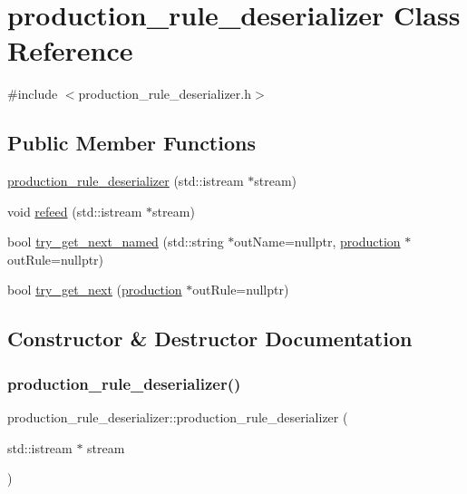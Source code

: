\hypertarget{classproduction__rule__deserializer}{}\section{production\+\_\+rule\+\_\+deserializer Class Reference}
\label{classproduction__rule__deserializer}


{\ttfamily \#include $<$production\+\_\+rule\+\_\+deserializer.\+h$>$}

\subsection*{Public Member Functions}
\begin{DoxyCompactItemize}
\item 
\mbox{\hyperlink{classproduction__rule__deserializer_a7a3ef59bfb52ee7d24087a29f0c31614}{production\+\_\+rule\+\_\+deserializer}} (std\+::istream $\ast$stream)
\item 
void \mbox{\hyperlink{classproduction__rule__deserializer_a12eb54478b2e86fed70db8c7a1131111}{refeed}} (std\+::istream $\ast$stream)
\item 
bool \mbox{\hyperlink{classproduction__rule__deserializer_a0394f0fc142fa283f84a951c94bca242}{try\+\_\+get\+\_\+next\+\_\+named}} (std\+::string $\ast$out\+Name=nullptr, \mbox{\hyperlink{classproduction}{production}} $\ast$out\+Rule=nullptr)
\item 
bool \mbox{\hyperlink{classproduction__rule__deserializer_a12fef5492a82d2716670f09b558d4ce3}{try\+\_\+get\+\_\+next}} (\mbox{\hyperlink{classproduction}{production}} $\ast$out\+Rule=nullptr)
\end{DoxyCompactItemize}


\subsection{Constructor \& Destructor Documentation}
\mbox{\label{classproduction__rule__deserializer_a7a3ef59bfb52ee7d24087a29f0c31614}} 
\subsubsection{\texorpdfstring{production\_rule\_deserializer()}{production\_rule\_deserializer()}}
{\footnotesize\ttfamily production\+\_\+rule\+\_\+deserializer\+::production\+\_\+rule\+\_\+deserializer (\begin{DoxyParamCaption}\item[{std\+::istream $\ast$}]{stream }\end{DoxyParamCaption})\hspace{0.3cm}{\ttfamily [inline]}}




